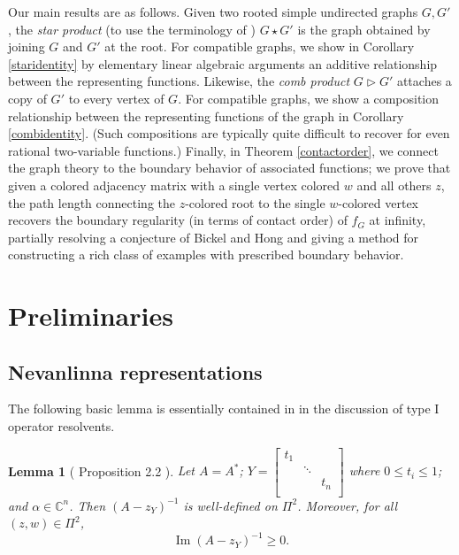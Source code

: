 \documentclass[12pt]{amsart}
\newtheorem{lemma}[theorem]{Lemma}
\theoremstyle{remark}
\DeclareMathOperator{\IM}{Im}
\newcommand{\inv}{^{-1}}
\numberwithin{equation}{section}
\newcommand{\comb}{\triangleright}
\begin{document}
Our main results are as follows. Given two rooted simple undirected graphs $G, G'$, the \emph{star product} (to use the terminology of \cite{ahl22}) $G \star G'$ is the graph obtained by joining $G$ and $G'$ at the root. For compatible graphs, we show in Corollary \ref{staridentity} by elementary linear algebraic arguments an additive relationship between the representing functions. Likewise, the \emph{comb product} $G \comb G'$ attaches a copy of $G'$ to every vertex of $G$. For compatible graphs, we show a composition relationship between the representing functions of the graph in Corollary \ref{combidentity}. (Such compositions are typically quite difficult to recover for even rational two-variable functions.) Finally, in Theorem \ref{contactorder}, we connect the graph theory to the boundary behavior of associated functions; we prove that given a colored adjacency matrix with a single vertex colored $w$ and all others $z$,  the path length connecting the $z$-colored root to the single $w$-colored vertex recovers the boundary regularity (in terms of contact order) of $f_G$ at infinity, partially resolving a conjecture of Bickel and Hong \cite{bickelhong} and giving a method for constructing a rich class of examples with prescribed boundary behavior.




\section{Preliminaries}

\subsection{Nevanlinna representations}

The following basic lemma is essentially contained in \cite{aty12} in the discussion of type I operator resolvents.

\begin{lemma}[\cite{aty12} Proposition 2.2 ]\label{nevproperties}
    Let $A = A^*$; $Y = \begin{bmatrix} 
t_{1} & & \\
& \ddots & \\
& & t_{n} \\
\end{bmatrix}$ where $0 \leq t_{i} \leq 1$; and $\alpha \in \mathbb{C}^n$. Then $(A - z_Y)\inv$ is well-defined on $\Pi^2$. Moreover, for all $(z,w) \in \Pi^2$,
\[
\IM (A - z_Y)\inv \geq 0.
\]

\end{lemma}
\end{document}
